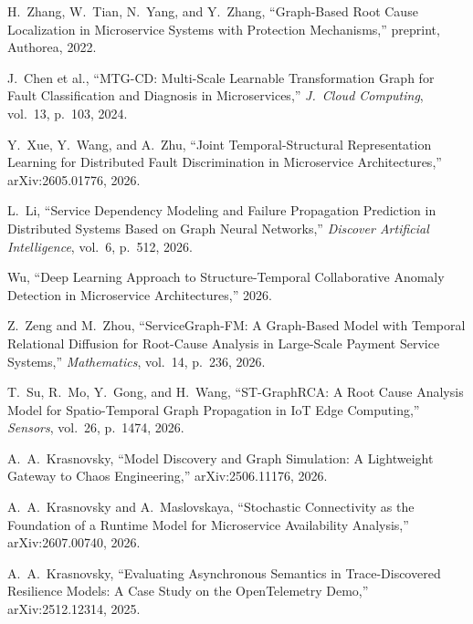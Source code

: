 \documentclass[11pt,a4paper]{article}
\begin{document}
\begin{enumerate}[leftmargin=2em,itemsep=2pt,label={[\arabic*]}]
  \item H.\ Zhang, W.\ Tian, N.\ Yang, and Y.\ Zhang, ``Graph-Based Root Cause
        Localization in Microservice Systems with Protection Mechanisms,''
        preprint, Authorea, 2022.

  \item J.\ Chen et al., ``MTG-CD: Multi-Scale Learnable Transformation Graph
        for Fault Classification and Diagnosis in Microservices,'' \emph{J.\
        Cloud Computing}, vol.\ 13, p.\ 103, 2024.

  \item Y.\ Xue, Y.\ Wang, and A.\ Zhu, ``Joint Temporal-Structural
        Representation Learning for Distributed Fault Discrimination in
        Microservice Architectures,'' arXiv:2605.01776, 2026.

  \item L.\ Li, ``Service Dependency Modeling and Failure Propagation
        Prediction in Distributed Systems Based on Graph Neural Networks,''
        \emph{Discover Artificial Intelligence}, vol.\ 6, p.\ 512, 2026.

  \item Wu, ``Deep Learning Approach to Structure-Temporal Collaborative
        Anomaly Detection in Microservice Architectures,'' 2026.

  \item Z.\ Zeng and M.\ Zhou, ``ServiceGraph-FM: A Graph-Based Model with
        Temporal Relational Diffusion for Root-Cause Analysis in Large-Scale
        Payment Service Systems,'' \emph{Mathematics}, vol.\ 14, p.\ 236, 2026.

  \item T.\ Su, R.\ Mo, Y.\ Gong, and H.\ Wang, ``ST-GraphRCA: A Root Cause
        Analysis Model for Spatio-Temporal Graph Propagation in IoT Edge
        Computing,'' \emph{Sensors}, vol.\ 26, p.\ 1474, 2026.

  \item A.\ A.\ Krasnovsky, ``Model Discovery and Graph Simulation: A
        Lightweight Gateway to Chaos Engineering,'' arXiv:2506.11176, 2026.

  \item A.\ A.\ Krasnovsky and A.\ Maslovskaya, ``Stochastic Connectivity as
        the Foundation of a Runtime Model for Microservice Availability
        Analysis,'' arXiv:2607.00740, 2026.

  \item A.\ A.\ Krasnovsky, ``Evaluating Asynchronous Semantics in
        Trace-Discovered Resilience Models: A Case Study on the OpenTelemetry
        Demo,'' arXiv:2512.12314, 2025.


\end{enumerate}
\end{document}

